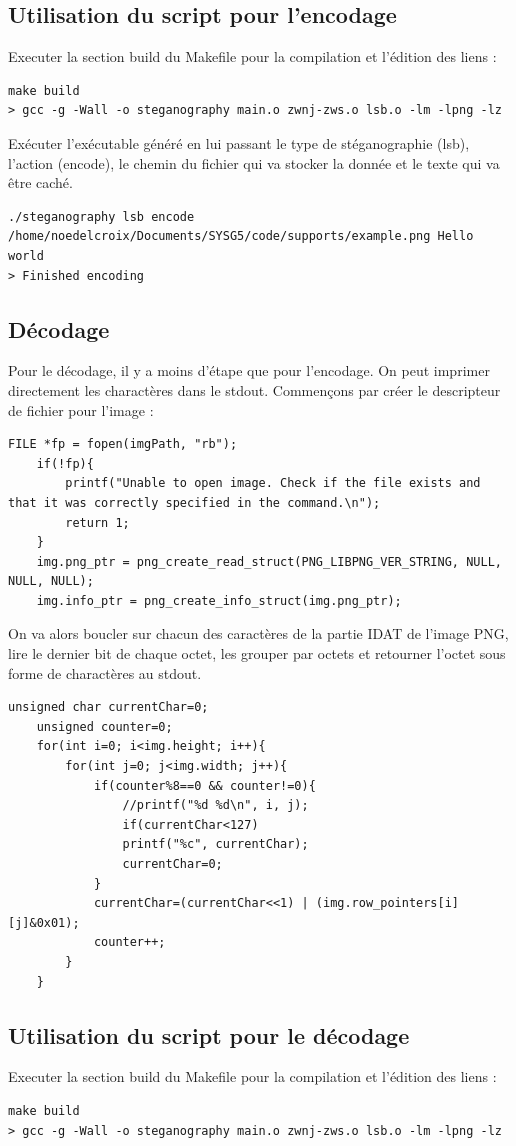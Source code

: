 \subsection{Utilisation du script pour l'encodage}
Executer la section build du Makefile pour la compilation et l'édition des liens :
\begin{lstlisting}
make build
> gcc -g -Wall -o steganography main.o zwnj-zws.o lsb.o -lm -lpng -lz
\end{lstlisting}
Exécuter l'exécutable généré en lui passant le type de stéganographie (lsb), l'action (encode), le chemin du fichier qui va stocker la donnée et le texte qui va être caché.
\begin{lstlisting}
./steganography lsb encode /home/noedelcroix/Documents/SYSG5/code/supports/example.png Hello world
> Finished encoding
\end{lstlisting}
\subsection{Décodage}
Pour le décodage, il y a moins d'étape que pour l'encodage. On peut imprimer directement les charactères dans le stdout.
\newline
Commençons par créer le descripteur de fichier pour l'image :
\begin{lstlisting}
FILE *fp = fopen(imgPath, "rb");
    if(!fp){
        printf("Unable to open image. Check if the file exists and that it was correctly specified in the command.\n");
        return 1;
    }
    img.png_ptr = png_create_read_struct(PNG_LIBPNG_VER_STRING, NULL, NULL, NULL);
    img.info_ptr = png_create_info_struct(img.png_ptr);
\end{lstlisting}
On va alors boucler sur chacun des caractères de la partie IDAT de l'image PNG, lire le dernier bit de chaque octet, les grouper par octets et retourner l'octet sous forme de charactères au stdout.
\begin{lstlisting}
unsigned char currentChar=0;
    unsigned counter=0;
    for(int i=0; i<img.height; i++){
        for(int j=0; j<img.width; j++){
            if(counter%8==0 && counter!=0){
                //printf("%d %d\n", i, j);
                if(currentChar<127)
                printf("%c", currentChar);
                currentChar=0;
            }
            currentChar=(currentChar<<1) | (img.row_pointers[i][j]&0x01);
            counter++;
        }
    }
\end{lstlisting}
\subsection{Utilisation du script pour le décodage}
Executer la section build du Makefile pour la compilation et l'édition des liens :
\begin{lstlisting}
make build
> gcc -g -Wall -o steganography main.o zwnj-zws.o lsb.o -lm -lpng -lz
\end{lstlisting}

